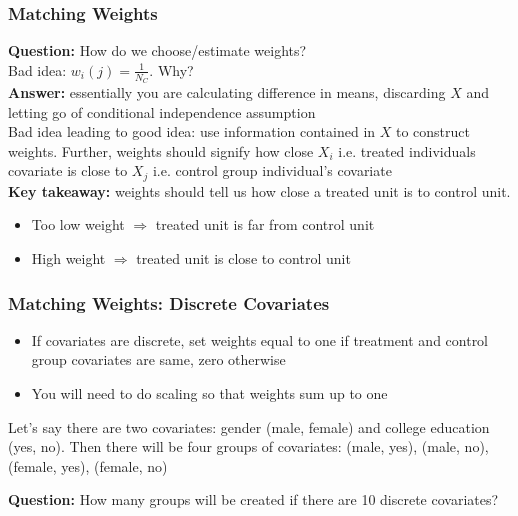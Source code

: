 \documentclass{beamer}
\theoremstyle{plain}
\begin{document}
\begin{frame}
	\frametitle{Matching Weights}
	 \textbf{Question:} How do we choose/estimate weights?\\
	 \vspace{1em}
	 Bad idea: $w_{i}(j) = \frac{1}{N_C}$.  Why?\\
	 \pause
	 \vspace{1em}
	 \textbf{Answer:} essentially you are calculating difference in means, discarding $X$ and letting go of conditional independence assumption\\
	 \vspace{1em}
	 Bad idea leading to good idea: use information contained in $X$ to construct weights. Further, weights should signify how close $X_i$ i.e. treated individuals covariate is close to $X_j$ i.e. control group individual's covariate\\
	 \vspace{1em}
	 \textbf{Key takeaway:} weights should tell us how close a treated unit is to control unit.
	 	\begin{itemize}
	 		\item Too low weight $\Rightarrow$ treated unit is far from control unit
	 		\item High weight $\Rightarrow$ treated unit is close to control unit
	 	\end{itemize}
\end{frame}

\begin{frame}
	\frametitle{Matching Weights: Discrete Covariates}
	\begin{itemize}
		\item 	If covariates are discrete, set weights equal to one if treatment and control group covariates are same, zero otherwise
		\item You will need to do scaling so that weights sum up to one
	\end{itemize}
\begin{example}
	Let's say there are two covariates: gender (male, female) and college education (yes, no). Then there will be four groups of covariates: (male, yes), (male, no), (female, yes), (female, no)
\end{example}
\vspace{2em}

\textbf{Question:}	How many groups will be created if there are 10 discrete covariates?

\end{frame}
\end{document}
